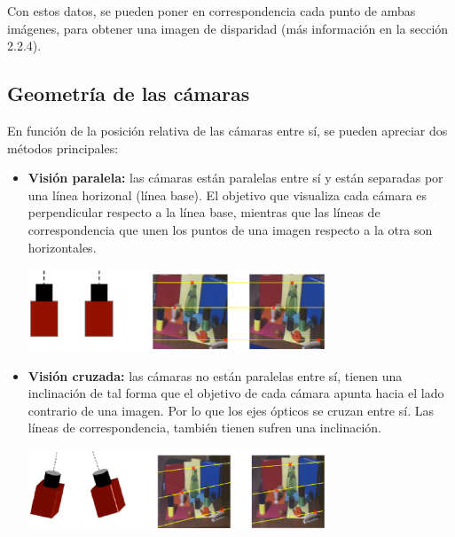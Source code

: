 Con estos datos, se pueden poner en correspondencia cada punto de ambas
imágenes, para obtener una imagen de disparidad (más información en la sección 
2.2.4).

\subsection{Geometría de las cámaras}
En función de la posición relativa de las cámaras entre sí, se pueden apreciar
dos métodos principales:

\begin{itemize}
  \item \textbf{Visión paralela:} las cámaras están paralelas entre sí y están
  separadas por una línea horizonal (línea base). El objetivo que visualiza
  cada cámara es perpendicular respecto a la línea base, mientras que las
  líneas de correspondencia que unen los puntos de una imagen respecto a la
  otra son horizontales.

  \begin{minipage}{\linewidth}
      \centering
      \includegraphics[width=0.7\textwidth]{images/cap2/VisionParalela.eps}
      \label{fig:VisionParalela}
  \end{minipage}

  \item \textbf{Visión cruzada:} las cámaras no están paralelas entre sí,
  tienen una inclinación de tal forma que el objetivo de cada cámara apunta
  hacia el lado contrario de una imagen. Por lo que los ejes ópticos se cruzan
  entre sí. Las líneas de correspondencia, también tienen sufren una
  inclinación.

  \begin{minipage}{\linewidth}
      \centering
      \includegraphics[width=0.7\textwidth]{images/cap2/VisionCruzada.eps}
      \label{fig:VisionCruzada}
  \end{minipage}
\end{itemize}

